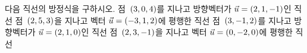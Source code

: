 다음 직선의 방정식을 구하시오.
 점~$(3{,}\mkern3mu\mathopen{}0{,}\mkern3mu\mathopen{}4)$를 지나고 방향벡터가 $\vec{u}=(2{,}\mkern3mu\mathopen{}1{,}\mkern3mu\mathopen{}-1)$인 직선
 점~$(2{,}\mkern3mu\mathopen{}5{,}\mkern3mu\mathopen{}3)$을 지나고 벡터 $\vec{u}=(-3{,}\mkern3mu\mathopen{}1{,}\mkern3mu\mathopen{}2)$에 평행한 직선
 점~$(3{,}\mkern3mu\mathopen{}-1{,}\mkern3mu\mathopen{}2)$를 지나고 방향벡터가 $\vec{u}=(2{,}\mkern3mu\mathopen{}1{,}\mkern3mu\mathopen{}0)$인 직선
 점~$(2{,}\mkern3mu\mathopen{}3{,}\mkern3mu\mathopen{}-1)$을 지나고 벡터 $\vec{u}=(0{,}\mkern3mu\mathopen{}-2{,}\mkern3mu\mathopen{}0)$에 평행한 직선
